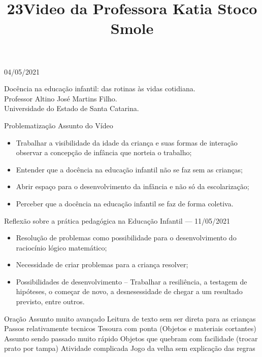 \documentclass{SchoolBook}
\begin{document}
    \begin{day}{04/05/2021}
        \title{2}{
            Docência na educação infantil: das rotinas às vidas cotidiana. \\
            Professor Altino José Martins Filho. \\
            Universidade do Estado de Santa Catarina.
        }

        \title{3}{Problematização Assunto do Vídeo}

        \begin{itemize}[nosep]
            \item Trabalhar a visibilidade da idade da criança e suas formas de interação observar a concepção de infância que norteia o trabalho;

            \item Entender que a docência na educação infantil não se faz sem as crianças;

            \item Abrir espaço para o desenvolvimento da infância e não só da escolarização;
            
            \item Perceber que a docência na educação infantil se faz de forma coletiva.
        \end{itemize}
    \end{day}
    
    \begin{day}{Reflexão sobre a prática pedagógica na Educação Infantil --- 11/05/2021}
        \title{Video da Professora Katia Stoco Smole}
        
        \begin{itemize}[nosep]
            \item Resolução de problemas como possibilidade para o desenvolvimento do raciocínio lógico matemático;
            \item Necessidade de criar problemas para a criança resolver;
            \item Possibilidades de desenvolvimento -- Trabalhar a resiliência, a testagem de hipóteses, o começar de novo, a desnesessidade de chegar a um resultado previsto, entre outros.
        \end{itemize}
        
        Oração
        Assunto muito avançado
        Leitura de texto sem ser direta para as crianças
        Passos relativamente tecnicos
        Tesoura com ponta
        (Objetos e materiais cortantes)
        Assunto sendo passado muito rápido
        Objetos que quebram com facilidade (trocar prato por tampa)
        Atividade complicada
        Jogo da velha sem explicação das regras 
        
    \end{day}
\end{document}

